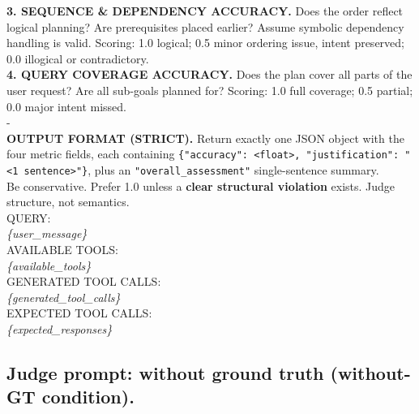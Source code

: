 \begin{promptbox}
\textbf{3. SEQUENCE \& DEPENDENCY ACCURACY.} Does the order reflect logical planning? Are prerequisites placed earlier? Assume symbolic dependency handling is valid. Scoring: 1.0 logical; 0.5 minor ordering issue, intent preserved; 0.0 illogical or contradictory.\\[3pt]
\textbf{4. QUERY COVERAGE ACCURACY.} Does the plan cover all parts of the user request? Are all sub-goals planned for? Scoring: 1.0 full coverage; 0.5 partial; 0.0 major intent missed.\\[4pt]
-\\
\textbf{OUTPUT FORMAT (STRICT).} Return exactly one JSON object with the four metric fields, each containing \texttt{\{"accuracy": <float>, "justification": "<1 sentence>"\}}, plus an \texttt{"overall\_assessment"} single-sentence summary.\\[4pt]
Be conservative. Prefer 1.0 unless a \textbf{clear structural violation} exists. Judge structure, not semantics.\\[6pt]
QUERY:\\
\textit{\{user\_message\}}\\[4pt]
AVAILABLE TOOLS:\\
\textit{\{available\_tools\}}\\[4pt]
GENERATED TOOL CALLS:\\
\textit{\{generated\_tool\_calls\}}\\[4pt]
EXPECTED TOOL CALLS:\\
\textit{\{expected\_responses\}}
\end{promptbox}

\subsection{Judge prompt: without ground truth (without-GT condition).}
\label{app:prompt-without GT}

